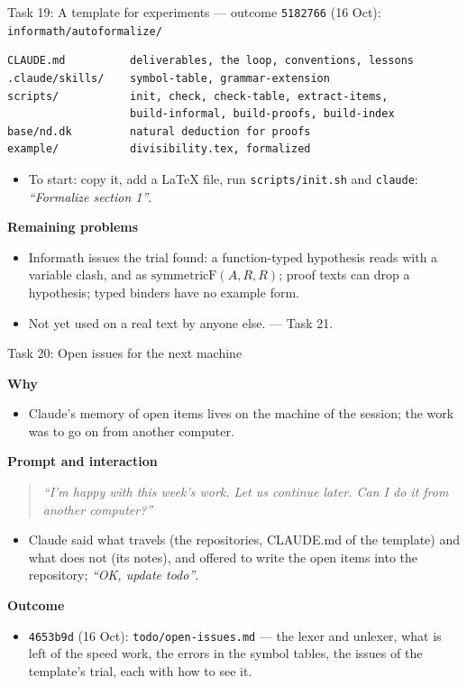 \documentclass[10pt,aspectratio=169]{beamer}
\newcommand{\bad}[1]{\textcolor{warn}{#1}}
\newcommand{\ok}[1]{\textcolor{good}{#1}}
\newcommand{\commit}[1]{\texttt{\footnotesize #1}}
\newcommand{\prompt}[1]{\begin{quote}\small\itshape ``#1''\end{quote}}
\newcommand{\why}{\par\textcolor{gfblue}{\textbf{Why}}\par}
\newcommand{\how}{\par\textcolor{gfblue}{\textbf{Prompt and interaction}}\par}
\newcommand{\what}{\par\textcolor{gfblue}{\textbf{Outcome}}\par}
\begin{document}
\begin{frame}[fragile]{Task 19: A template for experiments --- outcome}
  \commit{5182766} (16 Oct): \texttt{informath/autoformalize/}
\begin{lstlisting}
CLAUDE.md          deliverables, the loop, conventions, lessons
.claude/skills/    symbol-table, grammar-extension
scripts/           init, check, check-table, extract-items,
                   build-informal, build-proofs, build-index
base/nd.dk         natural deduction for proofs
example/           divisibility.tex, formalized
\end{lstlisting}
  \begin{itemize}\small
    \item To start: copy it, add a LaTeX file, run \texttt{scripts/init.sh} and
          \texttt{claude}: \emph{``Formalize section 1''}.
  \end{itemize}
  \textbf{Remaining problems}
  \begin{itemize}\small
    \item Informath issues the trial found: a function-typed hypothesis reads with a
          variable clash, and as \bad{$\mathrm{symmetricF}(A, R, R)$}; proof texts can
          drop a hypothesis; typed binders have no example form.
    \item Not yet used on a real text by anyone else. \ok{--- Task 21.}
  \end{itemize}
\end{frame}

\begin{frame}{Task 20: Open issues for the next machine}
  \why
  \begin{itemize}\small
    \item Claude's memory of open items lives on the machine of the session;
          the work was to go on from another computer.
  \end{itemize}
  \how
  \prompt{I'm happy with this week's work. Let us continue later. Can I do it from
    another computer?}
  \begin{itemize}\small
    \item Claude said what travels (the repositories, CLAUDE.md of the template) and
          what does not (its notes), and offered to write the open items into the
          repository; \emph{``OK, update todo''}.
  \end{itemize}
  \what
  \begin{itemize}\small
    \item \commit{4653b9d} (16 Oct): \texttt{todo/open-issues.md} --- the lexer and
          unlexer, what is left of the speed work, the errors in the symbol tables,
          the issues of the template's trial, each with how to see it.
  \end{itemize}
\end{frame}
\end{document}
